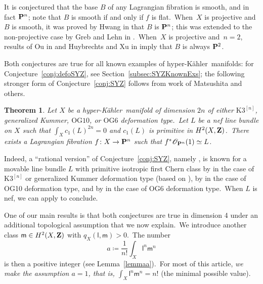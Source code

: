 \documentclass[12pt]{amsart}
\def\cO{\mathscr{O}}
\def\Z{{\bf Z}}
\def\P{{\bf P}}
\def\isom{\simeq}
\def\cong{\isom}
\def\hk{hyper-K\"ahler}
\newtheorem{theo}[lemm]{Theorem}
\theoremstyle{remark}
\def\lll{\ensuremath{\mathsf l}}
\def\mm{\ensuremath{\mathsf m}}
\begin{document}
It is conjectured that the base $B$ of any Lagrangian fibration is  smooth, and in fact $\P^n$; note that $B$ is smooth if and only if $f$ is flat.\ 
When~$X$ is projective and $B$ is smooth, it was proved by Hwang in \cite{hw} that $B$ is $\P^n$; this was extended to the non-projective case by Greb and Lehn in \cite{gl}.\ When~$X$ is projective and~$n=2$, results of Ou in \cite{ou} and  Huybrechts and Xu  in \cite{hx} imply that $B$ is always $\P^2$.\ 

Both conjectures are true  for all known examples of \hk\ manifolds: for Conjecture~\ref{conj:defoSYZ}, see Section~\ref{subsec:SYZKnownExs}; the following stronger form of  Conjecture~\ref{conj:SYZ} follows from work of Matsushita and others.

\begin{theo}\label{thm:SYZKnownExs}
Let $X$ be a \hk\ manifold of dimension $2n$ of either $\mathrm{K3}^{[n]}$,  generalized Kummer,  $\mathrm{OG10}$, or $\mathrm{OG6}$ deformation type.\
Let $L$ be a   nef line bundle on $X$ such that $\int_X c_1(L)^{2n}=0$ and $c_1(L)$ is primitive in $H^2(X,\Z)$.\
There exists a Lagrangian fibration $f\colon X\to \P^n$ such that $f^*\cO_{\P^n}(1)\cong L$.
\end{theo}

Indeed, a ``rational version'' of Conjecture~\ref{conj:SYZ}, namely \cite[Conjecture 1.1]{mat:isotropic}, is known for a  movable line bundle $L$ with primitive isotropic first Chern class by \cite[Corollary 1.1]{mat:isotropic} in the case of $\mathrm{K3}^{[n]}$ or generalized Kummer deformation type (based on \cite{bm,marlag,yos}), by \cite[Theorem 2.2]{mo} in the case of OG10 deformation type, and by \cite[Theorem 7.2]{mora} in the case of OG6 deformation type.\
When $L$ is nef,  we can apply \cite[Claim 3.1 and Claim 3.2]{mat:isotropic} to conclude.

One of our main results is that both conjectures are true in dimension 4 under an additional topological assumption that we now explain.\ We introduce another class $\mm\in H^2(X,\Z)$ with $q_X(\lll,\mm)>0$.\ 
The number
\begin{equation}\label{defaintro}
    a\coloneqq\frac{1}{n!}\int_X\lll^n\mm^n
\end{equation}
is then a positive integer (see Lemma~\ref{lemmaa}).\ 
For most of this article, {\em we make the assumption $a=1$, that is, $\int_X\lll^n\mm^n=n!$} (the minimal possible value).
\end{document}
